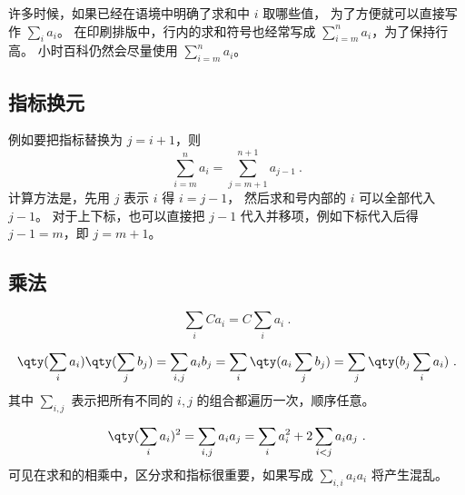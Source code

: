 许多时候，如果已经在语境中明确了求和中 $i$ 取哪些值， 为了方便就可以直接写作 $\sum\limits_i a_i$。 在印刷排版中，行内的求和符号也经常写成 $\sum_{i=m}^n a_i$，为了保持行高。 小时百科仍然会尽量使用 $\sum\limits_{i=m}^n a_i$。

\subsection{指标换元}
例如要把指标替换为 $j=i+1$，则
\begin{equation}
\sum_{i=m}^n a_i = \sum_{j=m+1}^{n+1} a_{j-1} ~.
\end{equation}
计算方法是，先用 $j$ 表示 $i$ 得 $i=j-1$， 然后求和号内部的 $i$ 可以全部代入 $j-1$。 对于上下标，也可以直接把 $j-1$ 代入并移项，例如下标代入后得 $j-1=m$，即 $j=m+1$。

\subsection{乘法}
\begin{equation}
\sum_i C a_i = C\sum_i a_i~.
\end{equation}

\begin{equation}
\qty(\sum_i a_i) \qty(\sum_j b_j) = \sum_{i,j} a_i b_j = \sum_i \qty(a_i \sum_j b_j) = \sum_j \qty(b_j \sum_i a_i)~.
\end{equation}
其中 $\sum\limits_{i,j}$ 表示把所有不同的 $i,j$ 的组合都遍历一次，顺序任意。

\begin{equation}
\qty(\sum_i a_i)^2 = \sum_{i,j} a_i a_j = \sum_i a_i^2 + 2\sum_{i<j} a_i a_j~.
\end{equation}
可见在求和的相乘中，区分求和指标很重要，如果写成 $\sum\limits_{i,i} a_i a_i$ 将产生混乱。

